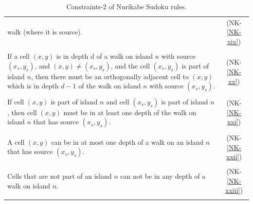 \begin{table}
\begin{tabular*}{\textwidth}{l @{\extracolsep{\fill}} c}
{        walk (where it is source).} & (NK-\ref{NK-xix})\\
        \\
        \makecell[cl]{If a cell $(x,y)$ is in depth d of a walk on island $n$ with\\
        source $(x_s,y_s)$, and $(x,y) \neq (x_s,y_s)$, and the cell\\
        $(x_s,y_s)$ is part of island $n$, then there must be an\\
        orthogonally adjacent cell to $(x,y)$ which is in depth\\
        $d-1$ of the walk on island $n$ with source $(x_s,y_s)$.} & (NK-\ref{NK-xx})\\
        \\
        \makecell[cl]{If cell $(x,y)$ is part of island $n$ and cell $(x_s,y_s)$ is part\\
        of island $n$, then cell $(x,y)$ must be in at least one\\
        depth of the walk on island $n$ that has source $(x_s,y_s)$.} & (NK-\ref{NK-xxi})\\
        \\
        \makecell[cl]{A cell $(x,y)$ can be in at most one depth of a walk on\\
        an island $n$ that has source $(x_s,y_s)$.} & (NK-\ref{NK-xxii})\\
        \\
        \makecell[cl]{Cells that are not part of an island $n$ can not be in\\
        any depth of a walk on island $n$.} & (NK-\ref{NK-xxiii})\\
        \\
        \hline
    \end{tabular*}
        \caption{Constraints-2 of Nurikabe Sudoku rules.}
    \label{Constraints:NurikabeSudoku2}
\end{table}


